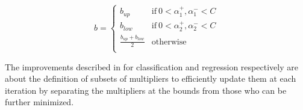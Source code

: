 \begin{equation} \label{eq:smo_svr_b}
	b =
        \begin{cases}
            b_{up} & \text{if} \ 0 < \alpha_1^+, \alpha_1^- < C \\
            b_{low} & \text{if} \ 0 < \alpha_2^+, \alpha_2^- < C \\
            \displaystyle \frac{b_{up}+b_{low}}{2} & \text{otherwise} \\
        \end{cases}
\end{equation}

\bigskip
\bigskip

The improvements described in \cite{keerthi2001improvements, shevade1999improvements} for classification and regression respectively are about the definition of subsets of multipliers to efficiently update them at each iteration by separating the multipliers at the bounds from those who can be further minimized.

\newpage

